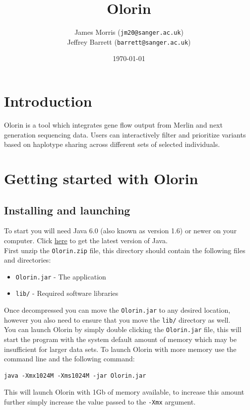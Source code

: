 \documentclass{article}
\title{Olorin}
\author{James Morris (\texttt{jm20@sanger.ac.uk})\\
Jeffrey Barrett (\texttt{barrett@sanger.ac.uk})}
\date{\today}
\begin{document}
\maketitle

\section{Introduction}

Olorin is a tool which integrates gene flow output from Merlin and next generation sequencing data. Users can interactively filter and prioritize variants based on haplotype sharing across different sets of selected individuals.

\section{Getting started with Olorin}
	\subsection{Installing and launching}
		To start you will need Java 6.0 (also known as version 1.6) or newer on your computer. Click \href{http://www.java.com/getjava/}{here} to get the latest version of Java.\\
		
		\noindent First unzip the \texttt{Olorin.zip} file, this directory should contain the following files and directories:
		\begin{itemize}
			\item{\texttt{Olorin.jar} - The application}
			\item{\texttt{lib/} - Required software libraries}
		\end{itemize}
		Once decompressed you can move the \texttt{Olorin.jar} to any desired location, however you also need to ensure that you move the \texttt{lib/} directory as well.\\

		\noindent You can launch Olorin by simply double clicking the \texttt{Olorin.jar} file, this will start the program with the system default amount of memory which may be insufficient for larger data sets. To launch Olorin with more memory use the command line and the following command:
\begin{verbatim}
java -Xmx1024M -Xms1024M -jar Olorin.jar  
\end{verbatim}
This will launch Olorin with 1Gb of memory available, to increase this amount further simply increase the value passed to the \texttt{-Xmx} argument.
\end{document}
